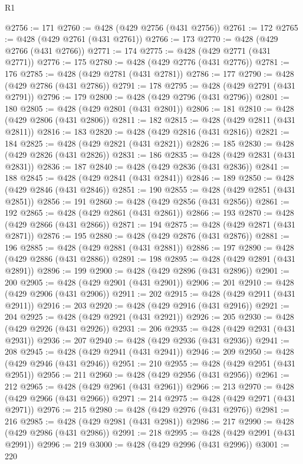 \begin{lexlean}{R1}
\begin{coremodule}
@2756 := 171
@2760 := @428 (@429 @2756 (@431 @2756))
@2761 := 172
@2765 := @428 (@429 @2761 (@431 @2761))
@2766 := 173
@2770 := @428 (@429 @2766 (@431 @2766))
@2771 := 174
@2775 := @428 (@429 @2771 (@431 @2771))
@2776 := 175
@2780 := @428 (@429 @2776 (@431 @2776))
@2781 := 176
@2785 := @428 (@429 @2781 (@431 @2781))
@2786 := 177
@2790 := @428 (@429 @2786 (@431 @2786))
@2791 := 178
@2795 := @428 (@429 @2791 (@431 @2791))
@2796 := 179
@2800 := @428 (@429 @2796 (@431 @2796))
@2801 := 180
@2805 := @428 (@429 @2801 (@431 @2801))
@2806 := 181
@2810 := @428 (@429 @2806 (@431 @2806))
@2811 := 182
@2815 := @428 (@429 @2811 (@431 @2811))
@2816 := 183
@2820 := @428 (@429 @2816 (@431 @2816))
@2821 := 184
@2825 := @428 (@429 @2821 (@431 @2821))
@2826 := 185
@2830 := @428 (@429 @2826 (@431 @2826))
@2831 := 186
@2835 := @428 (@429 @2831 (@431 @2831))
@2836 := 187
@2840 := @428 (@429 @2836 (@431 @2836))
@2841 := 188
@2845 := @428 (@429 @2841 (@431 @2841))
@2846 := 189
@2850 := @428 (@429 @2846 (@431 @2846))
@2851 := 190
@2855 := @428 (@429 @2851 (@431 @2851))
@2856 := 191
@2860 := @428 (@429 @2856 (@431 @2856))
@2861 := 192
@2865 := @428 (@429 @2861 (@431 @2861))
@2866 := 193
@2870 := @428 (@429 @2866 (@431 @2866))
@2871 := 194
@2875 := @428 (@429 @2871 (@431 @2871))
@2876 := 195
@2880 := @428 (@429 @2876 (@431 @2876))
@2881 := 196
@2885 := @428 (@429 @2881 (@431 @2881))
@2886 := 197
@2890 := @428 (@429 @2886 (@431 @2886))
@2891 := 198
@2895 := @428 (@429 @2891 (@431 @2891))
@2896 := 199
@2900 := @428 (@429 @2896 (@431 @2896))
@2901 := 200
@2905 := @428 (@429 @2901 (@431 @2901))
@2906 := 201
@2910 := @428 (@429 @2906 (@431 @2906))
@2911 := 202
@2915 := @428 (@429 @2911 (@431 @2911))
@2916 := 203
@2920 := @428 (@429 @2916 (@431 @2916))
@2921 := 204
@2925 := @428 (@429 @2921 (@431 @2921))
@2926 := 205
@2930 := @428 (@429 @2926 (@431 @2926))
@2931 := 206
@2935 := @428 (@429 @2931 (@431 @2931))
@2936 := 207
@2940 := @428 (@429 @2936 (@431 @2936))
@2941 := 208
@2945 := @428 (@429 @2941 (@431 @2941))
@2946 := 209
@2950 := @428 (@429 @2946 (@431 @2946))
@2951 := 210
@2955 := @428 (@429 @2951 (@431 @2951))
@2956 := 211
@2960 := @428 (@429 @2956 (@431 @2956))
@2961 := 212
@2965 := @428 (@429 @2961 (@431 @2961))
@2966 := 213
@2970 := @428 (@429 @2966 (@431 @2966))
@2971 := 214
@2975 := @428 (@429 @2971 (@431 @2971))
@2976 := 215
@2980 := @428 (@429 @2976 (@431 @2976))
@2981 := 216
@2985 := @428 (@429 @2981 (@431 @2981))
@2986 := 217
@2990 := @428 (@429 @2986 (@431 @2986))
@2991 := 218
@2995 := @428 (@429 @2991 (@431 @2991))
@2996 := 219
@3000 := @428 (@429 @2996 (@431 @2996))
@3001 := 220

\end{coremodule}
\end{lexlean}
